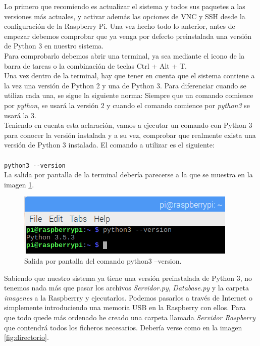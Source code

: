 Lo primero que recomiendo es actualizar el sistema y todos sus paquetes a las versiones más actuales, y activar además las opciones de VNC y SSH desde la configuración de la Raspberry Pi. Una vez hecho todo lo anterior, antes de empezar debemos comprobar que ya venga por defecto preinstalada una versión de Python 3 en nuestro sistema.\\
Para comprobarlo debemos abrir una terminal, ya sea mediante el icono de la barra de tareas o la combinación de teclas Ctrl + Alt + T.\\
Una vez dentro de la terminal, hay que tener en cuenta que el sistema contiene a la vez una versión de Python 2 y una de Python 3. Para diferenciar cuando se utiliza cada una, se sigue la siguiente norma: Siempre que un comando comience por \textit{python}, se usará la versión 2 y cuando el comando comience por \textit{python3} se usará la 3.\\
Teniendo en cuenta esta aclaración, vamos a ejecutar un comando con Python 3 para conocer la versión instalada y a su vez, comprobar que realmente exista una versión de Python 3 instalada. El comando a utilizar es el siguiente: \\ \\
\indent\verb|python3 --version| \\
La salida por pantalla de la terminal debería parecerse a la que se muestra en la imagen \ref{fig:version}.

\begin{figure}[h!]
	\centering
	\includegraphics[width=0.8\linewidth]{img/version_python}
	\caption{Salida por pantalla del comando python3 --version.}
	\label{fig:version}
\end{figure}

Sabiendo que nuestro sistema ya tiene una versión preinstalada de Python 3, no tenemos nada más que pasar los archivos \textit{Servidor.py}, \textit{Database.py} y la carpeta \textit{imagenes} a la Raspberrry y ejecutarlos. Podemos pasarlos a través de Internet o simplemente introduciendo una memoria USB en la Raspberry con ellos.
Para que todo quede más ordenado he creado una carpeta llamada \textit{Servidor Raspberry} que contendrá todos los ficheros necesarios. Debería verse como en la imagen \ref{fig:directorio}.


